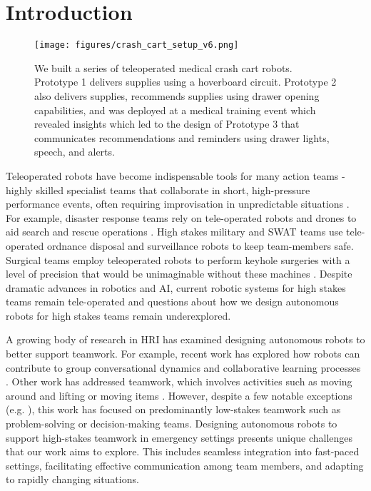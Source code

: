 

\section{Introduction}
 


\begin{figure}[t]
    \centering
 \texttt{[image: figures/crash\_cart\_setup\_v6.png]}
    \caption{We built a series of teleoperated medical crash cart robots. Prototype 1 delivers supplies using a hoverboard circuit. Prototype 2 also delivers supplies, recommends supplies using drawer opening capabilities, and was deployed %
    at a medical training event which revealed insights which led to the design of Prototype 3 that communicates recommendations and reminders using drawer lights, speech, and alerts.}
    \label{fig:cart_cart_field_studies}
\end{figure}



Teleoperated robots have become indispensable tools for many action teams - highly skilled specialist teams that collaborate in short, high-pressure performance events, often requiring improvisation in unpredictable situations \cite{sundstrom1990work}. 
For example, disaster response teams rely on tele-operated robots and drones to aid search and rescue operations \cite{casper2003human, murphy2017disaster}. 
High stakes military and SWAT teams use tele-operated ordnance disposal \cite{carpenter2016culture} and surveillance robots \cite{jones2002autonomous} to keep team-members safe. 
Surgical teams employ teleoperated robots to perform keyhole surgeries with a level of precision that would be unimaginable without these machines \cite{cheatle2019sensing, beane2019shadow}. 
Despite dramatic advances in robotics and AI, current robotic systems for high stakes teams remain tele-operated and questions about how we design autonomous robots for high stakes teams remain underexplored.


A growing body of research in HRI has examined designing autonomous robots to better support teamwork. 
For example, recent work has explored how robots can contribute to group conversational dynamics and collaborative learning processes \cite{tennent2019micbot,alves2019empathic}. 
Other work has addressed teamwork, which involves activities such as moving around and lifting or moving items \cite{fourie2022joint}. 
However, despite a few notable exceptions (e.g. \cite{bethel2012discoveries, jones2002extreme}), this work has focused on predominantly low-stakes teamwork such as problem-solving or decision-making teams. 
Designing autonomous robots to support high-stakes teamwork in emergency settings presents unique challenges that our work aims to explore. 
This includes seamless integration into fast-paced settings, facilitating effective communication among team members, and adapting to rapidly changing situations.


